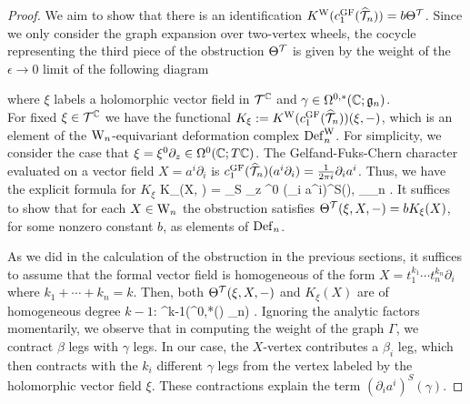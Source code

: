 \begin{proof}
We aim to show that there is an identification $K^{\rm W} (c_1^{\rm GF}(\widehat{\mathcal T}_n)) = b \Theta^\mathcal T$. Since we only consider the graph expansion over two-vertex wheels, the cocycle representing the third piece of the obstruction $\Theta^\mathcal T$ is given by the weight of the $\epsilon \to 0$ limit of the following diagram
\begin{center}
\end{center}
where $\xi$ labels a holomorphic vector field in $\mathcal T^\mathbb C$ and $\gamma \in \Omega^{0,*}(\mathbb C ; \mathfrak g_n)$.\\

For fixed $\xi \in \mathcal T^\mathbb C$ we have the functional $K_\xi := K^{\rm W}(c_1^{{\rm GF}}(\widehat{\mathcal T}_n))(\xi, -)$, which is an element of the ${{\rm W}_n}$-equivariant deformation complex ${\rm Def}_n^{\rm W}$. For simplicity, we consider the case that $\xi = \xi^0 \partial_z \in \Omega^{0}(\mathbb C ; T \mathbb C)$. The Gelfand-Fuks-Chern character evaluated on a vector field $X = a^i \partial_i$ is $c_1^{{\rm GF}}(\widehat{\mathcal T}_n)(a^i \partial_i) = \frac{1}{2\pi i} \partial_i a^i$. Thus, we have the explicit formula for $K_\xi$
\ben
K_\xi(X, \gamma) = \int_S \partial_z \xi^0 \<(\partial_i a^i)^S(\gamma), \partial \gamma\>_{\fg_n} .
\een
It suffices to show that for each $X \in {{\rm W}_n}$ the obstruction satisfies $\Theta^{\mathcal T}(\xi, X, -) = b K_\xi(X)$, for some nonzero constant $b$, as elements of ${\rm Def}_n$. 

As we did in the calculation of the obstruction in the previous sections, it suffices to assume that the formal vector field is homogeneous of the form $X = t_1^{k_1} \cdots t_n^{k_n} \partial_i$ where $k_1 + \cdots + k_n = k$. Then, both $\Theta^{\mathcal T}(\xi, X, -)$ and $K_\xi(X)$ are of homogeneous degree $k-1$:
\ben
\Sym^{k-1}(\Omega^{0,*}(\CC) \tensor \fg_n) \to \CC .
\een 
Ignoring the analytic factors momentarily, we observe that in computing the weight of the graph $\Gamma$,
we contract $\beta$ legs with $\gamma$ legs. In our case, the $X$-vertex contributes a $\beta_i$ leg,
which then contracts with the $k_i$ different $\gamma$ legs from the vertex labeled by the holomorphic vector field $\xi$. These contractions explain the term $(\partial_i a^i)^S(\gamma)$.


\end{proof}
